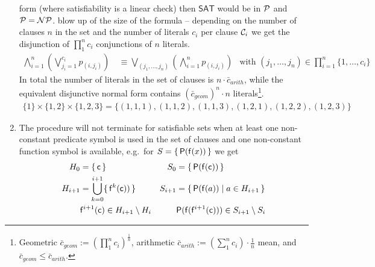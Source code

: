 \begin{enumerate}
{		form (where satisfiability is a linear check) 
		then $\mathsf{SAT}$ would be in ${\mathcal P}$
		and ${\mathcal P} = {\mathcal N}{\mathcal P}$. 
	}  
	blow up of the size of the formula 
	-- depending on the number of clauses $n$ in the set 
	and the number of literals $c_i$ per clause ${\mathcal C}_i$ 
	we get the disjunction of
	$\prod_{1}^{n} c_i$ 
	conjunctions of $n$ literals.
	  \begin{align*}
	  \bigwedge_{i=1}^{n} 
	  \left(
	  	\bigvee_{j_i=1}^{c_i} p_{(i,j_i)} 
	  \right)
	  \ &\equiv
	  \bigvee_{(j_1,\ldots,j_n)}
	  \left(
	  	\bigwedge_{i=1}^{n} p_{(i,j_i)}
	  \right)
	  &\text{with }(j_1,\ldots,j_n)\in\prod_{i=1}^{n}\{ 1,\ldots,c_i \}
	\end{align*}
	In total the number of literals in the set of clauses is 
	$n\cdot \bar{c}_{arith}$, 
	while the equivalent disjunctive normal form contains 
	$(\bar{c}_{geom})^n\cdot n$ literals\footnote{
		Geometric $\bar{c}_{geom} := \left(\prod_{1}^{n}c_i\right)^{\frac{1}{n}}$, 
		arithmetic $\bar{c}_{arith} := \left(\sum_{1}^{n}c_i\right)\cdot\frac{1}{n}$ mean, and
				$\bar{c}_{geom} 
				\leq 
				\bar{c}_{arith}$.
	}.
	\begin{gather*}
		\{ 1 \}\times\{1,2\}\times\{1,2,3\} = 
		\{
			(1,1,1),(1,1,2),(1,1,3),
			(1,2,1),(1,2,2),(1,2,3)
		\}
	\end{gather*}
	
	\item\label{enum:gilmore:termination}
	The procedure will not terminate for satisfiable sets 
	when at least one non-constant predicate symbol is used in the set of clauses and 
	one non-constant function symbol is available, e.g.~for $S=\{\,{\mathsf P}({\mathsf f}(x)) \,\}$ we get
	\begin{align*}
	H_0 &= \{\,{\mathsf c}\,\} & S_0 &= \{\,{\mathsf P}({\mathsf f}({\mathsf c}))\,\} 
	\\
	H_{i+1} &= \bigcup_{k=0}^{i+1}\{\, {\mathsf f}^{k}({\mathsf c}))\,\}
	& 
	S_{i+1} &= \{\, {\mathsf P}({\mathsf f}(a)) \mid a\in H_{i+1}
	\,\}
	\\
	 &{\mathsf f}^{i+1}({\mathsf c}) \in H_{i+1}\setminus H_i
	 &
	 &
	 {\mathsf P}({\mathsf f}({\mathsf f}^{i+1}({\mathsf c}))) \in S_{i+1} \setminus S_i
	\end{align*}
\end{enumerate}




